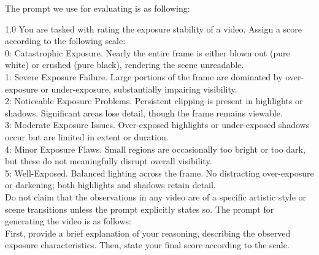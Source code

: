 The prompt we use for evaluating is as following: 
\begin{evolbox}{1.0}
You are tasked with rating the exposure stability of a video. Assign a score according to the following scale: \\

0: Catastrophic Exposure. Nearly the entire frame is either blown out (pure white) or crushed (pure black), rendering the scene unreadable. \\

1: Severe Exposure Failure. Large portions of the frame are dominated by over-exposure or under-exposure, substantially impairing visibility. \\

2: Noticeable Exposure Problems. Persistent clipping is present in highlights or shadows. Significant areas lose detail, though the frame remains viewable. \\

3: Moderate Exposure Issues. Over-exposed highlights or under-exposed shadows occur but are limited in extent or duration. \\

4: Minor Exposure Flaws. Small regions are occasionally too bright or too dark, but these do not meaningfully disrupt overall visibility. \\

5: Well-Exposed. Balanced lighting across the frame. No distracting over-exposure or darkening; both highlights and shadows retain detail. \\

Do not claim that the observations in any video are of a specific artistic style or scene transitions unless the prompt explicitly states so. The prompt for generating the video is as follows: \\

First, provide a brief explanation of your reasoning, describing the observed exposure characteristics. Then, state your final score according to the scale.
\end{evolbox}

